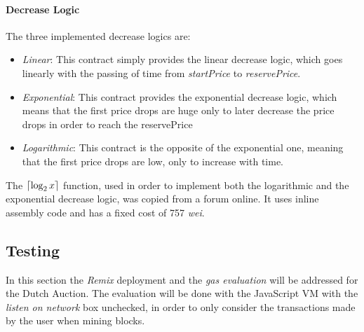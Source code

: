 \documentclass[11pt, a4paper]{report}
\DeclarePairedDelimiter{\ceil}{\lceil}{\rceil}
\begin{document}
	
	\paragraph*{Decrease Logic}
	The three implemented decrease logics are:
	\begin{itemize}
		\item \emph{Linear}: This contract simply provides the linear decrease logic, which goes linearly with the passing of time from \emph{startPrice} to \emph{reservePrice}.
		\item \emph{Exponential}: This contract provides the exponential decrease logic, which means that the first price drops are huge only to later decrease the price drops in order to reach the reservePrice
		\item \emph{Logarithmic}: This contract is the opposite of the exponential one, meaning that the first price drops are low, only to increase with time.
	\end{itemize}
	The $\ceil{\log_2x}$ function, used in order to implement both the logarithmic and the exponential decrease logic, was copied from a forum online. It uses inline assembly code and has a fixed cost of 757 \emph{wei}.
	
	\subsection*{Testing}
	In this section the \emph{Remix} deployment and the \emph{gas evaluation} will be addressed for the Dutch Auction. The evaluation will be done with the JavaScript VM with the \emph{listen on network} box unchecked, in order to only consider the transactions made by the user when mining blocks.
	
\end{document}
